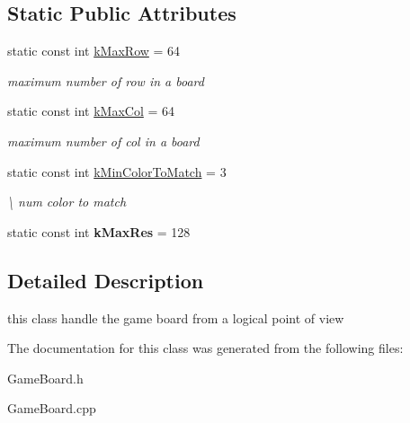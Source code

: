 \subsection*{Static Public Attributes}
\begin{DoxyCompactItemize}
\item 
\hypertarget{class_game_board_ab579dd1e4a379675c58778d1da128e74}{static const int \hyperlink{class_game_board_ab579dd1e4a379675c58778d1da128e74}{k\-Max\-Row} = 64}\label{class_game_board_ab579dd1e4a379675c58778d1da128e74}

\begin{DoxyCompactList}\small\item\em maximum number of row in a board \end{DoxyCompactList}\item 
\hypertarget{class_game_board_a898b0f017577f1384d9c58a04b392bf3}{static const int \hyperlink{class_game_board_a898b0f017577f1384d9c58a04b392bf3}{k\-Max\-Col} = 64}\label{class_game_board_a898b0f017577f1384d9c58a04b392bf3}

\begin{DoxyCompactList}\small\item\em maximum number of col in a board \end{DoxyCompactList}\item 
\hypertarget{class_game_board_acb2db0ae9e546a6527d4f9a26a927751}{static const int \hyperlink{class_game_board_acb2db0ae9e546a6527d4f9a26a927751}{k\-Min\-Color\-To\-Match} = 3}\label{class_game_board_acb2db0ae9e546a6527d4f9a26a927751}

\begin{DoxyCompactList}\small\item\em \textbackslash{} num color to match \end{DoxyCompactList}\item 
\hypertarget{class_game_board_a79252b40dfc63b61defdfbce1b8de9d9}{static const int {\bfseries k\-Max\-Res} = 128}\label{class_game_board_a79252b40dfc63b61defdfbce1b8de9d9}

\end{DoxyCompactItemize}


\subsection{Detailed Description}
this class handle the game board from a logical point of view 

The documentation for this class was generated from the following files\-:\begin{DoxyCompactItemize}
\item 
Game\-Board.\-h\item 
Game\-Board.\-cpp\end{DoxyCompactItemize}
